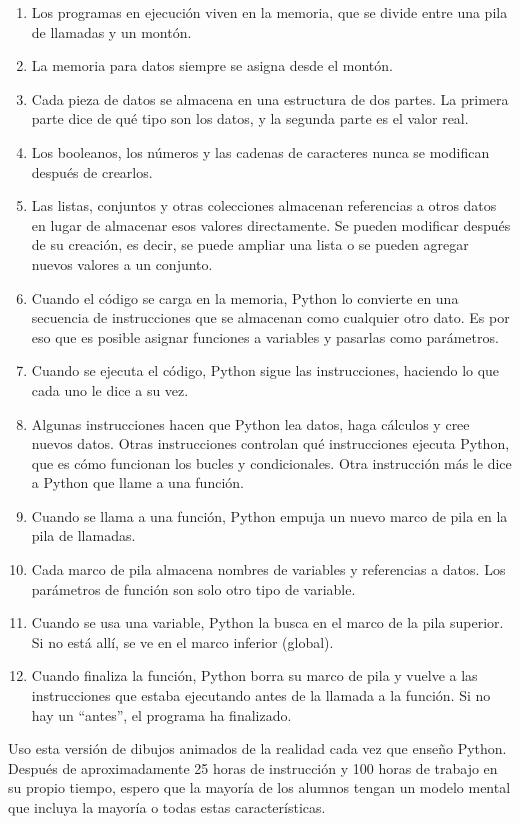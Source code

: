 \documentclass[
]{book}
\begin{document}
\begin{enumerate}
\def\labelenumi{\arabic{enumi}.}
\item
  Los programas en ejecución viven en la memoria, que se divide entre una pila de llamadas y un montón.
\item
  La memoria para datos siempre se asigna desde el montón.
\item
  Cada pieza de datos se almacena en una estructura de dos partes. La primera parte dice de qué tipo son los datos, y la segunda parte es el valor real.
\item
  Los booleanos, los números y las cadenas de caracteres nunca se modifican después de crearlos.
\item
  Las listas, conjuntos y otras colecciones almacenan referencias a otros datos en lugar de almacenar esos valores directamente. Se pueden modificar después de su creación, es decir, se puede ampliar una lista o se pueden agregar nuevos valores a un conjunto.
\item
  Cuando el código se carga en la memoria, Python lo convierte en una secuencia de instrucciones que se almacenan como cualquier otro dato. Es por eso que es posible asignar funciones a variables y pasarlas como parámetros.
\item
  Cuando se ejecuta el código, Python sigue las instrucciones, haciendo lo que cada uno le dice a su vez.
\item
  Algunas instrucciones hacen que Python lea datos, haga cálculos y cree nuevos datos. Otras instrucciones controlan qué instrucciones ejecuta Python, que es cómo funcionan los bucles y condicionales. Otra instrucción más le dice a Python que llame a una función.
\item
  Cuando se llama a una función, Python empuja un nuevo marco de pila en la pila de llamadas.
\item
  Cada marco de pila almacena nombres de variables y referencias a datos. Los parámetros de función son solo otro tipo de variable.
\item
  Cuando se usa una variable, Python la busca en el marco de la pila superior. Si no está allí, se ve en el marco inferior (global).
\item
  Cuando finaliza la función, Python borra su marco de pila y vuelve a las instrucciones que estaba ejecutando antes de la llamada a la función. Si no hay un ``antes'', el programa ha finalizado.
\end{enumerate}

Uso esta versión de dibujos animados de la realidad cada vez que enseño Python. Después de aproximadamente 25 horas de instrucción y 100 horas de trabajo en su propio tiempo, espero que la mayoría de los alumnos tengan un modelo mental que incluya la mayoría o todas estas características.
\end{document}

